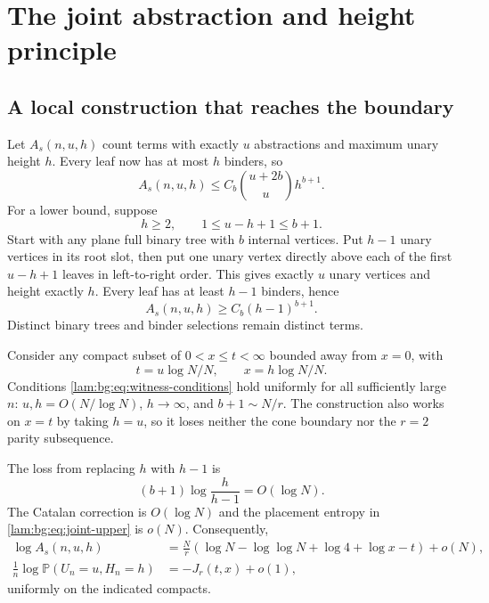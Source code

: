 \documentclass[11pt,a4paper]{article}
\numberwithin{equation}{section}
\theoremstyle{remark}
\newcommand{\Prob}{\mathbb P}
\begin{document}
\section{The joint abstraction and height principle}\label{lam:bg:sec:joint}

\subsection{A local construction that reaches the boundary}
Let $A_s(n,u,h)$ count terms with exactly $u$ abstractions and maximum unary height $h$. Every leaf now has at most $h$ binders, so
\begin{equation}\label{lam:bg:eq:joint-upper}
 A_s(n,u,h)\le C_b\binom{u+2b}{u}h^{b+1}.
\end{equation}
For a lower bound, suppose
\begin{equation}\label{lam:bg:eq:witness-conditions}
 h\ge2,\qquad1\le u-h+1\le b+1.
\end{equation}
Start with any plane full binary tree with $b$ internal vertices. Put $h-1$ unary vertices in its root slot, then put one unary vertex directly above each of the first $u-h+1$ leaves in left-to-right order. This gives exactly $u$ unary vertices and height exactly $h$. Every leaf has at least $h-1$ binders, hence
\begin{equation}\label{lam:bg:eq:joint-lower}
 A_s(n,u,h)\ge C_b(h-1)^{b+1}.
\end{equation}
Distinct binary trees and binder selections remain distinct terms.

Consider any compact subset of $0<x\le t<\infty$ bounded away from $x=0$, with
\[
 t=u\log N/N,\qquad x=h\log N/N.
\]
Conditions \eqref{lam:bg:eq:witness-conditions} hold uniformly for all sufficiently large $n$: $u,h=O(N/\log N)$, $h\to\infty$, and $b+1\sim N/r$. The construction also works on $x=t$ by taking $h=u$, so it loses neither the cone boundary nor the $r=2$ parity subsequence.

The loss from replacing $h$ with $h-1$ is
\[
 (b+1)\log\frac h{h-1}=O(\log N).
\]
The Catalan correction is $O(\log N)$ and the placement entropy in \eqref{lam:bg:eq:joint-upper} is $o(N)$. Consequently,
\begin{align}
 \log A_s(n,u,h)
 &=\frac Nr\left(\log N-\log\log N+\log4+\log x-t\right)+o(N),
 \label{lam:bg:eq:joint-log}\\
 \frac1n\log\Prob(U_n=u,H_n=h)&=-J_r(t,x)+o(1),\label{lam:bg:eq:joint-local}
\end{align}
uniformly on the indicated compacts.
\end{document}

